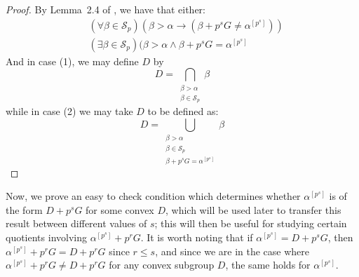 \documentclass[a4paper,11pt]{article}
\begin{document}
\begin{proof}
	By Lemma~2.4 of \cite{QE}, we have that either:
	\begin{align}
		&(\forall \beta\in \mathcal{S}_p)(\beta > \alpha \rightarrow (\beta+p^sG \neq\alpha^{[p^s]})) \\
		&(\exists\beta\in \mathcal{S}_p)(\beta > \alpha \wedge \beta + p^sG = \alpha^{[p^s]}
	\end{align}
	\setcounter{equation}{0}
	And in case (1), we may define $D$ by
	$$D = \bigcap\limits_{\substack{\beta > \alpha\\\beta\in \mathcal{S}_p }}\beta$$
	while in case (2) we may take $D$ to be defined as:
	$$D = \bigcup\limits_{\substack{\beta > \alpha\\\beta\in \mathcal{S}_p \\ \beta + p^sG = \alpha^{[p^s]}}}\beta$$
\end{proof}
\noindent
Now, we prove an easy to check condition which determines whether $\alpha^{[p^s]}$ is of the form $D+p^sG$ for some convex $D$, which will be used later to transfer this result between different values of $s$; this will then be useful for studying certain quotients involving $\alpha^{[p^s]}+p^rG$. It is worth noting that if $\alpha^{[p^s]} = D+p^sG$, then $\alpha^{[p^s]}+p^rG = D+p^rG$ since $r\leq s$, and since we are in the case where $\alpha^{[p^s]}+p^rG\neq D+p^rG$ for any convex subgroup $D$, the same holds for $\alpha^{[p^s]}$.
\end{document}
